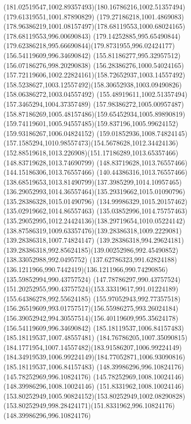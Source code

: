 {{\curveto(181.02519547,1002.89357493)(180.16786216,1002.51357494)(179.61319551,1001.87890829)
\curveto(179.27186218,1001.4869083)(178.96386219,1001.08157497)(178.68119553,1000.68024165)
\lineto(178.68119553,996.00690843)
\curveto(179.14252885,995.65490844)(179.62386218,995.66690844)(179.8731955,996.02424177)
\moveto(156.54119609,996.34690842)
\lineto(155.81186277,995.32957512)
\lineto(156.07186276,998.20290838)
\curveto(156.28386276,1000.54024165)(157.72119606,1002.22824161)(158.72652937,1003.14557492)
\curveto(158.5238627,1003.12557492)(158.30652938,1003.09490826)(158.06386272,1003.04557492)
\lineto(155.48919611,1002.51357494)
\lineto(157.3465294,1004.37357489)
\curveto(157.98386272,1005.00957487)(158.87186269,1005.48157486)(159.65452934,1005.89890819)
\curveto(159.74119601,1005.94557485)(159.837196,1005.99624152)(159.93186267,1006.04824152)
\curveto(159.01852936,1008.74824145)(157.1585294,1010.98557473)(154.5678628,1012.34424136)
\curveto(152.88519618,1013.226908)(151.17186289,1013.65357466)(148.83719628,1013.74690799)
\lineto(148.83719628,1013.76557466)
\lineto(144.15186306,1013.76557466)
\curveto(140.44386316,1013.76557466)(138.68519653,1013.81490799)(137.3985299,1014.10957465)
\curveto(136.29052993,1014.36557464)(135.29319662,1015.01090796)(135.28386328,1015.01490796)
\lineto(134.99986329,1015.20157462)
\lineto(135.02919662,1014.86557463)
\curveto(135.03852996,1014.75757463)(135.29052995,1012.24424136)(138.29719654,1010.05224142)
\curveto(138.87586319,1009.63357476)(139.28386318,1009.2229081)(139.28386318,1007.74824147)
\lineto(139.28386318,994.29624181)
\curveto(139.28386318,992.85624185)(139.00252986,992.45490852)(138.33052988,992.0495752)
\curveto(137.62786323,991.62824188)(136.1211966,990.7442419)(136.1211966,990.74290856)
\lineto(135.59852994,990.43757524)
\lineto(147.78786297,990.43757524)
\curveto(151.20252955,990.43757524)(153.33319617,991.01224189)(155.64386278,992.55624185)
\curveto(155.97052943,992.77357518)(156.26519609,993.01757517)(156.55986275,993.26024184)
\curveto(156.39052942,994.30557514)(156.40119609,995.35624178)(156.54119609,996.34690842)
\moveto(185.18119537,1006.84157483)
\lineto(185.18119537,1007.48557481)
\curveto(184.76786205,1007.35090815)(184.1771954,1007.14557482)(183.91586207,1006.99224149)
\curveto(184.34919539,1006.99224149)(184.77052871,1006.93090816)(185.18119537,1006.84157483)
\moveto(148.39986296,996.10824176)
\lineto(145.78252969,996.10824176)
\lineto(145.78252969,1008.10024146)
\lineto(148.39986296,1008.10024146)
\curveto(151.8331962,1008.10024146)(153.80252949,1005.90824152)(153.80252949,1002.08290828)
\curveto(153.80252949,998.28424171)(151.8331962,996.10824176)(148.39986296,996.10824176)
}
}

